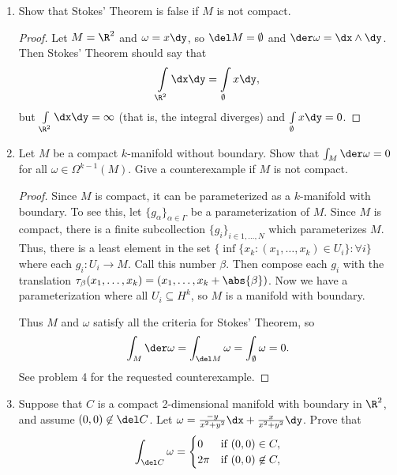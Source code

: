 \documentclass[letterpaper]{article}
\begin{document}
\begin{enumerate}
\begin{proof}
\[\begin{array}{rcl}
			g^*{\dz}&=&-\sin\phi\der\phi			
		\end{array}	\]
		Thus, 
		\[\begin{array}{rcl}
			\int_{S^2}\omega &=& \int g^*(x\dy\wedge\dz-y\dx\wedge\dz+z\dx\wedge\dy)\\
			&=&\iint\big[-\cos^2\theta\sin^3\phi-\sin^2\theta\sin^3\phi+\cos\phi(-\cos^2\theta\sin\phi\cos\phi-\sin^2\theta\sin\phi\cos\phi)\big]\der\theta\der\phi\\
			&&\text{(Pythagorean identity 3 times)}\phantom{\int\
			limits^{2}_{2}}\\
			&=&\int\limits_0^{2\pi}\der\theta\int\limits_0^{\pi}-\sin\phi\der\phi\\
			&=&4\pi
		\end{array}\]
		This contradicts our assumption that $\omega$ is exact, so we are done. 
	\end{proof}
	
	\item Show that Stokes' Theorem is false if $M$ is not compact. 
	\begin{proof}
		Let $M=\R^2$ and $\omega=x\dy$, so $\del M=\emptyset$ and $\der\omega=\dx\wedge\dy$. Then Stokes' Theorem should say that 
		$$\int\limits_{\R^2}\dx\dy=\int\limits_\emptyset x\dy,$$
		but $\int\limits_{\R^2}\dx\dy=\infty$ (that is, the integral diverges) and $\int\limits_\emptyset x\dy=0$.
	\end{proof}
	
	\item Let $M$ be a compact $k$-manifold without boundary. Show that $\int_M\der\omega=0$ for all $\omega \in \Omega^{k-1}(M)$. Give a counterexample if $M$ is not compact. 
	\begin{proof}
		Since $M$ is compact, it can be parameterized as a $k$-manifold with boundary. To see this, let $\{g_\alpha\}_{\alpha\in\Gamma}$ be a parameterization of $M$. Since $M$ is compact, there is a finite subcollection $\{g_i\}_{i\in1,\dots, N}$ which parameterizes $M$. Thus, there is a least element in the set $\{\inf \{x_k : (x_1, \dots, x_k)\in U_i\}: \forall i\}$ where each $g_i:U_i\to M$. Call this number $\beta$. Then compose each $g_i$ with the translation $\tau_\beta(x_1, \dots, x_k)=(x_1, \dots, x_k+\abs{\beta})$. Now we have a parameterization where all $U_i\subseteq H^k$, so $M$ is a manifold with boundary. 
		
		Thus $M$ and $\omega$ satisfy all the criteria for Stokes' Theorem, so 
		$$\int_M\der\omega=\int_{\del M}\omega=\int_\emptyset\omega=0.$$
		See problem 4 for the requested counterexample. 
	\end{proof}
	
	\item Suppose that $C$ is a compact 2-dimensional manifold with boundary in $\R^2$, and assume $(0,0)\not\in\del C$. Let $\omega=\frac{-y}{x^2+y^2}\dx+\frac{x}{x^2+y^2}\dy$. Prove that
	\[\int_{\del C}\omega = 
	\begin{cases}
		0 & \text{if } (0,0)\in C,\\ 
		2\pi & \text{if } (0,0)\not\in C,\\
	\end{cases}\]
	
\end{enumerate}
\end{document}
